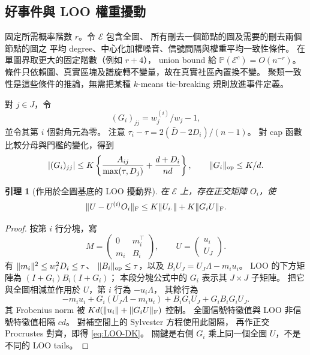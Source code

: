 \documentclass[11pt,a4paper]{article}
\theoremstyle{zhplain}
\newtheorem{lemma}[theorem]{引理}
\numberwithin{equation}{section}
\newcommand{\PP}{\mathbb P}
\newcommand{\op}{\mathrm{op}}
\newcommand{\Frob}{\mathrm{F}}
\newcommand{\cE}{\mathcal E}
\DeclarePairedDelimiter{\norm}{\lVert}{\rVert}
\begin{document}
\subsection{好事件與 LOO 權重擾動}
固定所需概率階數 \(r\)。令 \(\cE\) 包含全圖、
所有刪去一個節點的圖及需要的刪去兩個節點的圖之
平均 degree、中心化加權噪音、信號間隔與權重平均一致性條件。
在單圖界取更大的固定階數（例如 \(r+4\)），
union bound 給 \(\PP(\cE^c)=O(n^{-r})\)。
條件只依賴圖、真實區塊及譜旋轉不變量，故在真實社區內置換不變。
聚類一致性是這些條件的推論，無需把某種 \(k\)-means tie-breaking
規則放進事件定義。

對 \(j\in J\)，令
\[
 (G_i)_{jj}=w_j^{(i)}/w_j-1,
\]
並令其第 \(i\) 個對角元為零。
注意
\(\tau_i-\tau=2(\bar D-2D_i)/(n-1)\)。
對 cap 函數比較分母與門檻的變化，得到
\begin{equation}
 |(G_i)_{jj}|
 \le K\left\{
 \frac{A_{ij}}{\max(\tau,D_j)}
 +\frac{d+D_i}{nd}\right\},
 \qquad \norm{G_i}_{\op}\le K/d.
 \label{eq:weight-LOO-perturbation}
\end{equation}

\begin{lemma}[作用於全圖基底的 LOO 擾動界]
\label{lem:LOO-DK}
在 \(\cE\) 上，存在正交矩陣 \(O_i\)，使
\begin{equation}
 \norm{U-U^{(i)}O_i}_{\Frob}
 \le K\norm{U_{i\cdot}}+K\norm{G_iU}_{\Frob}.
 \label{eq:LOO-DK}
\end{equation}
\end{lemma}
\begin{proof}
按第 \(i\) 行分塊，寫
\[
 M=\begin{pmatrix}0&m_i^\top\\m_i&B_i\end{pmatrix},
 \qquad U=\begin{pmatrix}u_i\\U_J\end{pmatrix}.
\]
有 \(\norm{m_i}^2\le w_i^2D_i\le\tau\)、
\(\norm{B_i}_{\op}\le\tau\)，以及
\(B_iU_J=U_J\Lambda-m_i u_i\)。
LOO 的下方矩陣為 \((I+G_i)B_i(I+G_i)\)；
本段分塊公式中的 \(G_i\) 表示其 \(J\times J\) 子矩陣。
把它與全圖相減並作用於 \(U\)，第 \(i\) 行為 \(-u_i\Lambda\)，
其餘行為
\[
 -m_i u_i+
 G_i(U_J\Lambda-m_i u_i)+B_iG_iU_J+G_iB_iG_iU_J.
\]
其 Frobenius norm 被
\(Kd(\norm{u_i}+\norm{G_iU}_{\Frob})\) 控制。
全圖信號特徵值與 LOO 非信號特徵值相隔 \(cd\)。
對補空間上的 Sylvester 方程使用此間隔，
再作正交 Procrustes 對齊，即得 \eqref{eq:LOO-DK}。
關鍵是右側 \(G_i\) 乘上同一個全圖 \(U\)，不是不同的 LOO tails。
\end{proof}
\end{document}
